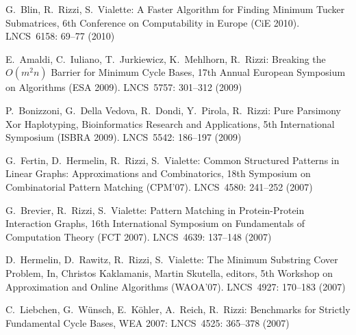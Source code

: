 \begin{etaremune}
\vspace{-1.8mm}
  \item {G.~Blin, R.~Rizzi, S.~Vialette:}
   \newblock A Faster Algorithm for Finding Minimum Tucker Submatrices,
   \newblock 6th Conference on Computability in Europe (CiE 2010).
   \newblock LNCS~6158: 69--77 (2010)

\vspace{-1.8mm}
  \item {E.~Amaldi, C.~Iuliano, T.~Jurkiewicz, K.~Mehlhorn, R.~Rizzi:}
   \newblock Breaking the $O(m^2n)$ Barrier for Minimum Cycle Bases,
   \newblock 17th Annual European Symposium on Algorithms (ESA 2009).
   \newblock LNCS~5757: 301--312 (2009)

\vspace{-1.8mm}
  \item {P.~Bonizzoni, G.~Della Vedova, R.~Dondi, Y.~Pirola, R.~Rizzi:}
   \newblock Pure Parsimony Xor Haplotyping,
   \newblock Bioinformatics Research and Applications, 5th International Symposium (ISBRA 2009).
   \newblock LNCS~5542: 186--197 (2009)

\vspace{-1.8mm}
  \item {G.~Fertin, D.~Hermelin, R.~Rizzi, S.~Vialette:}
   \newblock Common Structured Patterns in Linear Graphs: Approximations and Combinatorics,
   \newblock 18th Symposium on Combinatorial Pattern Matching (CPM'07).
   \newblock LNCS~4580: 241--252 (2007)

\vspace{-1.8mm}
  \item {G.~Brevier, R.~Rizzi, S.~Vialette:}
   \newblock Pattern Matching in Protein-Protein Interaction Graphs,
   \newblock 16th International Symposium on Fundamentals
              of Computation Theory (FCT 2007).
   \newblock LNCS~4639: 137--148 (2007)

\vspace{-1.8mm}
  \item {D.~Hermelin, D.~Rawitz, R.~Rizzi, S.~Vialette:}
   \newblock The Minimum Substring Cover Problem,
   \newblock In, Christos Kaklamanis, Martin Skutella, editors,
   \newblock 5th Workshop on Approximation and Online Algorithms (WAOA'07).
   \newblock LNCS~4927: 170--183 (2007)

\vspace{-1.8mm}
  \item {C.~Liebchen, G.~W\"unsch, E.~K\"ohler, A.~Reich, R.~Rizzi:}
   \newblock Benchmarks for Strictly Fundamental Cycle Bases,
   \newblock WEA 2007:
   \newblock LNCS~4525: 365--378 (2007)


\end{etaremune}
